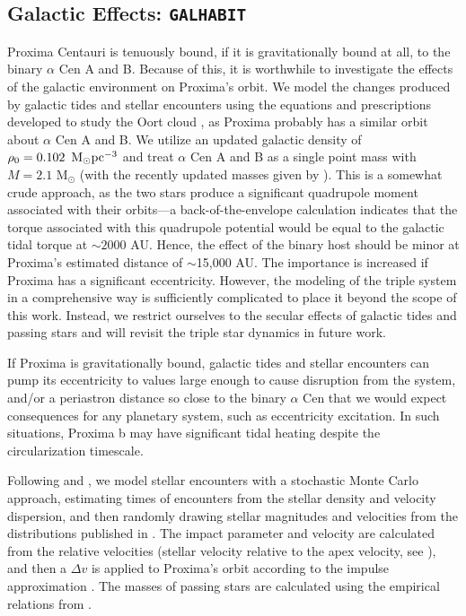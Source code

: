\documentclass[preprint,12pt]{aastex}
\def\msun{{\rm\,M_\odot}}
\def\eg{{\it e.g.\ }}
\def\galhabit{\texttt{\footnotesize{GALHABIT}}\xspace}
\begin{document}
\subsection{Galactic Effects: \galhabit}
\label{sec:models:galhabit}
Proxima Centauri is tenuously bound, if it is gravitationally bound at all, to 
the binary $\alpha$ Cen A and B. Because of this, it is worthwhile
to investigate the effects of the galactic environment on 
Proxima's orbit. We model the changes produced by galactic tides 
and stellar encounters using the equations and prescriptions 
developed to study the Oort cloud \citep{Heisler1986, Heisler1987, Rickman2008}, as Proxima probably has a similar orbit about $\alpha$ Cen A and B. We utilize an updated galactic 
density of $\rho_0 = 0.102~\msun \rm{pc}^{-3}$ \citep{Holmberg2000} and treat 
$\alpha$ Cen A and B as a single point mass with $M = 2.1$ 
M$_{\odot}$ (with the recently updated masses given by 
\cite{PourbaixBoffin16}). This is a somewhat crude approach, as 
the two stars produce a significant quadrupole moment associated 
with their orbits---a back-of-the-envelope calculation indicates
that the torque associated with this quadrupole potential would 
be equal to the galactic tidal torque at $\sim 2000$ AU. Hence, 
the effect of the binary host should be minor 
at Proxima's estimated distance of $\sim$15,000 AU. The importance is increased if Proxima has a significant eccentricity. However, the modeling of the 
triple system in a comprehensive way is sufficiently complicated
\citep[see, \eg][]{Harrington1968, Ford2000} to place it beyond 
the scope of this work. Instead, we restrict ourselves to the 
secular effects of galactic tides and passing stars 
and will revisit the triple star dynamics in future work. 

If Proxima is gravitationally bound, galactic tides and stellar 
encounters can pump its eccentricity to values large enough to 
cause disruption from the system, and/or a periastron distance 
so close to the binary $\alpha$ Cen that we would expect 
consequences for any planetary system, such as eccentricity 
excitation. In such situations, Proxima b may have significant tidal 
heating despite the circularization timescale. 

Following \cite{Heisler1987} and \cite{Rickman2008}, we model stellar
encounters with a stochastic Monte Carlo approach, estimating times 
of encounters from the stellar density and velocity dispersion, 
and then randomly drawing stellar magnitudes and velocities 
from the distributions published in \cite{Garciasanchez2001}. 
The impact parameter and velocity are calculated from the relative 
velocities (stellar velocity relative to the apex velocity, 
see \cite{Rickman2008}), and then a $\Delta v$ is applied to
Proxima's orbit according to the impulse approximation
\citep{Remy1985}. The masses of passing stars are calculated 
using the empirical relations from \cite{Reid2002}.
\end{document}
